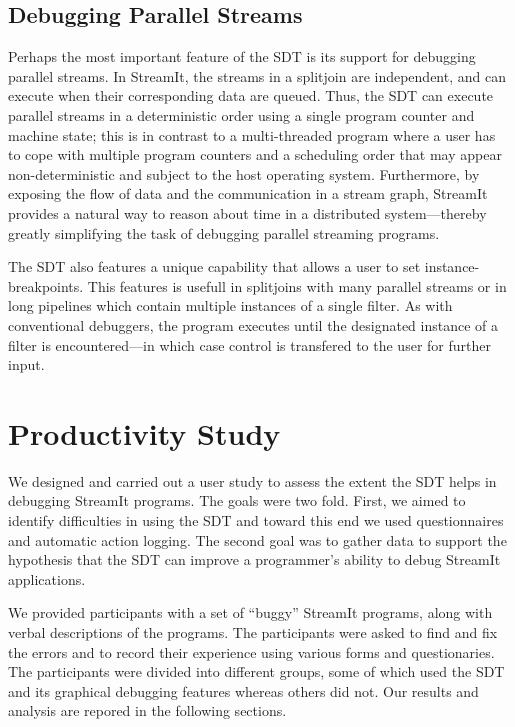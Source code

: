 \documentclass[11pt, letterpaper, onecolumn]{article}
\begin{document}
\subsection{Debugging Parallel Streams}

Perhaps  the most  important feature  of the  SDT is  its  support for
debugging parallel  streams. In StreamIt,  the streams in  a splitjoin
are  independent, and can  execute when  their corresponding  data are
queued.  Thus, the SDT can execute parallel streams in a deterministic
order using  a single  program counter and  machine state; this  is in
contrast to  a multi-threaded  program where a  user has to  cope with
multiple  program counters  and  a scheduling  order  that may  appear
non-deterministic   and  subject   to  the   host   operating  system.
Furthermore, by exposing  the flow of data and  the communication in a
stream graph, StreamIt provides a  natural way to reason about time in
a  distributed  system---thereby   greatly  simplifying  the  task  of
debugging parallel streaming programs.

The SDT  also features a unique  capability that allows a  user to set
instance-breakpoints. This features is usefull in splitjoins with many
parallel streams or in long pipelines which contain multiple instances
of  a  single filter.  As  with  conventional  debuggers, the  program
executes until the designated instance of a filter is encountered---in
which case control is transfered to the user for further input.



\section{Productivity Study}
\label{sec:ps}

We designed and carried out a  user study to assess the extent the SDT
helps in debugging StreamIt programs.  The goals were two fold. First,
we aimed to identify difficulties in using the SDT and toward this end
we used questionnaires and  automatic action logging.  The second goal
was to gather data to support  the hypothesis that the SDT can improve
a programmer's ability to debug StreamIt applications.

We provided  participants with a  set of ``buggy''  StreamIt programs,
along with verbal descriptions of the programs.  The participants were
asked to find and fix the  errors and to record their experience using
various forms  and questionaries.  The participants  were divided into
different  groups,  some of  which  used  the  SDT and  its  graphical
debugging features  whereas others did not.  Our  results and analysis
are repored  in the  following sections.
\end{document}
